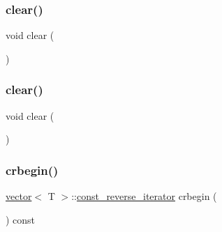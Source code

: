 \mbox{\label{classvector_a04eec80d86ebc36032d43bd8dbe9942a}} 
\subsubsection{\texorpdfstring{clear()}{clear()}\hspace{0.1cm}{\footnotesize\ttfamily [14/15]}}
{\footnotesize\ttfamily void clear (\begin{DoxyParamCaption}{ }\end{DoxyParamCaption})\hspace{0.3cm}{\ttfamily [noexcept]}}

\mbox{\label{classvector_a04eec80d86ebc36032d43bd8dbe9942a}} 
\subsubsection{\texorpdfstring{clear()}{clear()}\hspace{0.1cm}{\footnotesize\ttfamily [15/15]}}
{\footnotesize\ttfamily void clear (\begin{DoxyParamCaption}{ }\end{DoxyParamCaption})\hspace{0.3cm}{\ttfamily [noexcept]}}

\mbox{\label{classvector_a88bc4e3e004d58bb0404fd051acf7476}} 
\subsubsection{\texorpdfstring{crbegin()}{crbegin()}}
{\footnotesize\ttfamily \mbox{\hyperlink{classvector}{vector}}$<$ T $>$\+::\mbox{\hyperlink{classvector_a421ef78ccdc84f0f6b2b14e2732527ba}{const\+\_\+reverse\+\_\+iterator}} crbegin (\begin{DoxyParamCaption}{ }\end{DoxyParamCaption}) const\hspace{0.3cm}{\ttfamily [noexcept]}}

\mbox{\label{classvector_a461db7ad461ce36a720ec954b4d67951}} 
